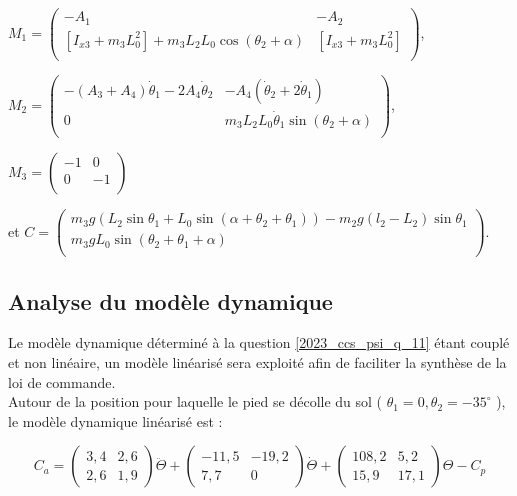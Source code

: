 \begin{corrige}
$M_1 = \begin{pmatrix}
-A_1 & - A_2 \\
\left[I_{x 3}+m_{3} L_{0}^{2}\right]  +m_{3} L_{2} L_{0}\cos \left(\theta_{2}+\alpha\right) & \left[I_{x 3}+m_{3} L_{0}^{2}\right] \\
\end{pmatrix}$,

$M_2 = \begin{pmatrix}
-\left(A_{3}+A_4\right) \dot{\theta}_{1}-2A_4 \dot{\theta}_2  & -A_4\left(\dot{\theta}_2+2\dot{\theta}_1\right) \\
0 & m_{3} L_{2} L_{0} \dot{\theta}_{1} \sin \left(\theta_{2}+\alpha\right) \\
\end{pmatrix}$, 

$M_3 = \begin{pmatrix}
- 1 & 0 \\
0 & - 1  \\
\end{pmatrix}$

et 
$C = \begin{pmatrix}
 m_3 g\left(  L_2 \sin \theta_1 +  L_0 \sin\left( \alpha + \theta_2 + \theta_1\right)\right) - m_2 g\left( l_2 - L_2\right) \sin \theta_1 \\
m_{3} g L_{0} \sin \left(\theta_{2}+\theta_{1}+\alpha\right) \\
\end{pmatrix}$.


\end{corrige}
\else
\fi


\subsection{Analyse du modèle dynamique}
\ifprof
\else
Le modèle dynamique déterminé à la question \ref{2023_ccs_psi_q_11} étant couplé et non linéaire, un modèle linéarisé sera exploité afin de faciliter la synthèse de la loi de commande.\\
Autour de la position pour laquelle le pied se décolle du sol ( $\theta_{1}=0, \theta_{2}=-35^{\circ}$ ), le modèle dynamique linéarisé est :

$$
C_{a}=\left(\begin{array}{cc}
3,4 & 2,6 \\
2,6 & 1,9
\end{array}\right) \ddot{\Theta}+\left(\begin{array}{cc}
-11,5 & -19,2 \\
7,7 & 0
\end{array}\right) \dot{\Theta}+\left(\begin{array}{cc}
108,2 & 5,2 \\
15,9 & 17,1
\end{array}\right) \Theta-C_{p}
$$

